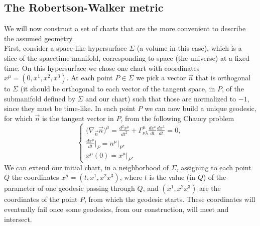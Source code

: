 \subsection{The Robertson-Walker metric}
We will now construct a set of charts that are the more convenient to describe the assumed geometry.\\
First, consider a space-like hypersurface $\Sigma$ (a volume in this case), which is a slice of the spacetime manifold, corresponding to space (the universe) at a fixed time. On this hypersurface we chose one chart with coordinates $x^\mu=(0,x^1,x^2,x^3)$. At each point $P\in\Sigma$ we pick a vector $\vec n$ that is orthogonal to $\Sigma$ (it should be orthogonal to each vector of the tangent space, in $P$, of the submanifold defined by $\Sigma$ and our chart) such that those are normalized to $-1$, since they must be time-like. In each point $P$ we can now build a unique geodesic, for which $\vec n$ is the tangent vector in $P$, from the following Chaucy problem
\begin{equation}\label{Chaucy problem}
    \begin{cases}
        \big(\nabla_{\vec n}\vec n\big)^\mu=\frac{d^2x^\mu}{dt^2}+\Gamma_{\nu\lambda}^{\mu}\frac{dx^\nu}{dt}\frac{dx^\lambda}{dt}=0,\\\frac{dx^\mu}{dt}\big|_{P}=n^\mu\big|_P,\\x^\mu(0)=x^\mu\big|_P.
    \end{cases}
\end{equation}
We can extend our initial chart, in a neighborhood of $\Sigma$, assigning to each point $Q$ the coordinates $x^\mu=(t,x^1,x^2x^3)$, where $t$ is the value (in $Q$) of the parameter of one geodesic passing through $Q$, and $(x^1,x^2x^3)$ are the coordinates of the point $P$, from which the geodesic starts. These coordinates will eventually fail once some geodesics, from our construction, will meet and intersect.\\

